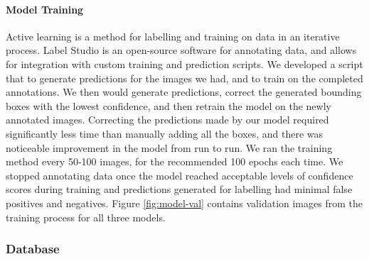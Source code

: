 \documentclass[thesis]{fputhesis}
\begin{document}
\begin{body}
\paragraph{Model Training}
Active learning is a method for labelling and training on data in an iterative process. Label Studio\cite{LabelStudio} is an open-source software for annotating data, and allows for integration with custom training and prediction scripts. We developed a script that to generate predictions for the images we had, and to train on the completed annotations. We then would generate predictions, correct the generated bounding boxes with the lowest confidence, and then retrain the model on the newly annotated images. Correcting the predictions made by our model required significantly less time than manually adding all the boxes, and there was noticeable improvement in the model from run to run. We ran the training method every 50-100 images, for the recommended 100 epochs each time. We stopped annotating data once the model reached acceptable levels of confidence scores during training and predictions generated for labelling had minimal false positives and negatives. Figure \ref{fig:model-val} contains validation images from the training process for all three models.

\subsubsection{Database}

\end{body}
\end{document}
